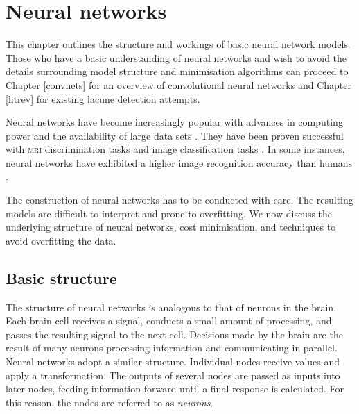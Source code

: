 %
%

\chapter{Neural networks}\label{neuralNets-intro}

This chapter outlines the structure and workings of basic neural network models. Those who have a basic understanding of neural networks and wish to avoid the details surrounding model structure and minimisation algorithms can proceed to Chapter \ref{convnets} for an overview of convolutional neural networks and Chapter \ref{litrev} for existing lacune detection attempts.

% 
% 

Neural networks have become increasingly popular with advances in computing power and the availability of large data sets \citep{Goodfellow-et-al-2016}. They have been proven successful with \textsc{mri} discrimination tasks \citep{DouQ.2016ADoC, Yokoyama2007} and image classification tasks \citep{HeKaiming2015DDiR, AlexNet2012, GoogLeNet2015}. In some instances, neural networks have exhibited a higher image recognition accuracy than humans \citep{HeKaiming2015DDiR}.

The construction of neural networks has to be conducted with care. The resulting models are difficult to interpret and prone to overfitting. We now discuss the underlying structure of neural networks, cost minimisation, and techniques to avoid overfitting the data.

\section{Basic structure}\label{nnets-structure}

The structure of neural networks is analogous to that of neurons in the brain. Each brain cell receives a signal, conducts a small amount of processing, and passes the resulting signal to the next cell. Decisions made by the brain are the result of many neurons processing information and communicating in parallel. Neural networks adopt a similar structure. Individual nodes receive values and apply a transformation. The outputs of several nodes are passed as inputs into later nodes, feeding information forward until a final response is calculated. For this reason, the nodes are referred to as \textit{neurons}.

